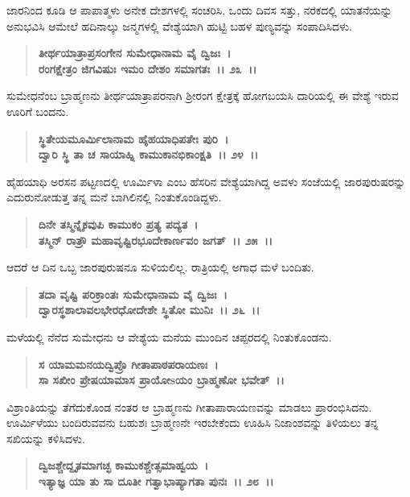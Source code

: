 ಜಾರನಿಂದ ಕೂಡಿ ಆ ಪಾಪಾತ್ಮಳು ಅನೇಕ ದೇಶಗಳಲ್ಲಿ ಸಂಚರಿಸಿ, ಒಂದು ದಿವಸ ಸತ್ತು, ನರಕದಲ್ಲಿ ಯಾತನೆಯನ್ನು ಅನುಭವಿಸಿ ಆಮೇಲೆ ಹದಿನಾಲ್ಕು ಜನ್ಮಗಳಲ್ಲಿ ವೇಶ್ಯೆಯಾಗಿ ಹುಟ್ಟಿ ಬಹಳ ಪುಣ್ಯವನ್ನು ಸಂಪಾದಿಸಿದಳು.

\begin{verse}
\textbf{ತೀರ್ಥಯಾತ್ರಾಪ್ರಸಂಗೇನ ಸುಮೇಧಾನಾಮ ವೈ ದ್ವಿಜಃ~।}\\\textbf{ರಂಗಕ್ಷೇತ್ರಂ ಜಿಗವಿಷುಃ ಇಮಂ ದೇಶಂ ಸಮಾಗತಃ~।। ೨೩~।।}
\end{verse}

ಸುಮೇಧನೆಂಬ ಬ್ರಾಹ್ಮಣನು ತೀರ್ಥಯಾತ್ರಾಪರನಾಗಿ ಶ‍್ರೀರಂಗ ಕ್ಷೇತ್ರಕ್ಕೆ ಹೋಗಬಯಸಿ ದಾರಿಯಲ್ಲಿ ಈ ವೇಶ್ಯೆ ಇರುವ ಊರಿಗೆ ಬಂದನು.

\begin{verse}
\textbf{ಸ್ಥಿತೇಯಮೂರ್ಮಿಲಾನಾಮ ಹೈಹಯಾಧಿಪತೇಃ ಪುರಿ~।}\\\textbf{ದ್ವಾರಿ ಸ್ಥಿ ತಾ ಚ ಸಾಯಾಹ್ನಿ ಕಾಮುಕಾನಭಿಕಾಂಕ್ಷತಿ~।। ೨೪~।।}
\end{verse}

ಹೈಹಯಾಧಿ ಅರಸನ ಪಟ್ಟಣದಲ್ಲಿ ಊರ್ಮಿಳಾ ಎಂಬ ಹೆಸರಿನ ವೇಶ್ಯೆಯಾಗಿದ್ದ ಅವಳು ಸಂಜೆಯಲ್ಲಿ ಜಾರಪುರುಷರನ್ನು ಎದುರುನೋಡುತ್ತ ತನ್ನ ಮನೆ ಬಾಗಿಲಿನಲ್ಲಿ ನಿಂತುಕೊಂಡಿದ್ದಳು.

\begin{verse}
\textbf{ದಿನೇ ತಸ್ಮಿನ್ನೈಕವುಪಿ ಕಾಮುಕಂ ಪ್ರತ್ಯ ಪದ್ಯತ~।}\\\textbf{ತಸ್ಮಿನ್ ರಾತ್ರೌ ಮಹಾವೃಷ್ಟಿರಭೂದೇಕಾರ್ಣವಂ ಜಗತ್~।। ೨೫~।।}
\end{verse}

ಆದರೆ ಆ ದಿನ ಒಬ್ಬ ಜಾರಪುರುಷನೂ ಸುಳಿಯಲಿಲ್ಲ. ರಾತ್ರಿಯಲ್ಲಿ ಅಗಾಧ ಮಳೆ ಬಂದಿತು.

\begin{verse}
\textbf{ತದಾ ವೃಷ್ಟಿ ಪರಿಕ್ರಾಂತಃ ಸುಮೇಧಾನಾಮ ವೈ ದ್ವಿಜಃ~।}\\\textbf{ದ್ವಾರಸ್ಥಶಾಲಾವಲಭೇರಧೋದೇಶೇ ಸ್ಥಿತೋ ಮುನಿಃ~।। ೨೬~।।}
\end{verse}

ಮಳೆಯಲ್ಲಿ ನೆನೆದ ಸುಮೇಧನು ಆ ವೇಶ್ಯೆಯ ಮನೆಯ ಮುಂದಿನ ಚಪ್ಪರದಲ್ಲಿ ನಿಂತುಕೊಂಡನು.

\begin{verse}
\textbf{ಸ ಯಾಮಮನಯದ್ವಿಪ್ರೊ ಗೀತಾಪಾಠಪರಾಯಣಃ~।}\\\textbf{ಸಾ ಸಖೀಂ ಪ್ರೇಷಯಾಮಾಸ ಪ್ರಾಯೋsಯಂ ಬ್ರಾಹ್ಮಣೋ ಭವೇತ್~।।}
\end{verse}

ವಿಶ್ರಾಂತಿಯನ್ನು ತೆಗೆದುಕೊಂಡ ನಂತರ ಆ ಬ್ರಾಹ್ಮಣನು ಗೀತಾಪಾರಾಯಣವನ್ನು ಮಾಡಲು ಪ್ರಾರಂಭಿಸಿದನು. ಊರ್ಮಿಳೆಯು ಬಂದಿರುವವನು ಬಹುಶಃ ಬ್ರಾಹ್ಮಣನೇ ಇರಬೇಕೆಂದು ಊಹಿಸಿ ನಿಜಾಂಶವನ್ನು ತಿಳಿಯಲು ತನ್ನ ಸಖಿಯನ್ನು ಕಳಿಸಿದಳು.

\begin{verse}
\textbf{ದ್ವಿಜಶ್ಚೇದ್ದೃತಮಾಗಚ್ಛ ಕಾಮುಕಶ್ಚೇತ್ಸಮಾಹ್ವಯ~।}\\\textbf{ಇತ್ಯಾಜ್ಞ ಯಾ ತು ಸಾ ದೂತೀ ಗತ್ವಾಭಾಷ್ಯಾಗತಾ ಪುನಃ~।। ೨೮~।।}
\end{verse}

